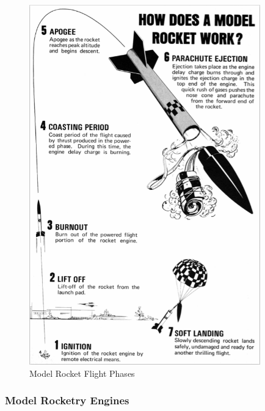 \documentclass{workreport}
\begin{document}
\begin{body}
	\begin{figure}[!ht]
		\centering
		\includegraphics[width=10cm]{./images/flight_phase.png}
		\caption{Model Rocket Flight Phases \cite{centuri_manual}}
		\label{fig:flight_phase}
	\end{figure}

\subsubsection{Model Rocketry Engines}


\end{body}
\end{document}
